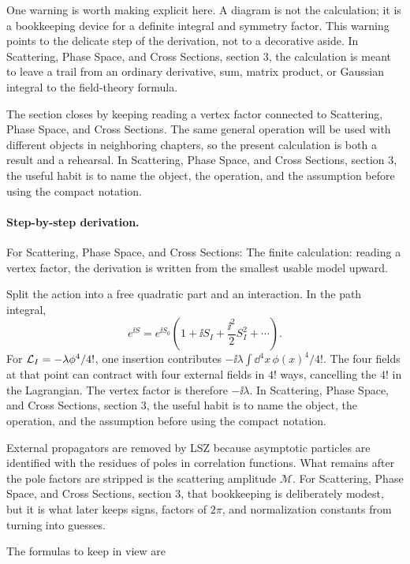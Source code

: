 One warning is worth making explicit here.  A diagram is not the calculation; it is a bookkeeping device for a definite integral and symmetry factor.  This warning points to the delicate step of the derivation, not to a decorative aside.  In Scattering, Phase Space, and Cross Sections, section 3, the calculation is meant to leave a trail from an ordinary derivative, sum, matrix product, or Gaussian integral to the field-theory formula.

The section closes by keeping reading a vertex factor connected to Scattering, Phase Space, and Cross Sections.  The same general operation will be used with different objects in neighboring chapters, so the present calculation is both a result and a rehearsal.  In Scattering, Phase Space, and Cross Sections, section 3, the useful habit is to name the object, the operation, and the assumption before using the compact notation.



\paragraph{Step-by-step derivation.}

For Scattering, Phase Space, and Cross Sections: The finite calculation: reading a vertex factor, the derivation is written from the smallest usable model upward.

Split the action into a free quadratic part and an interaction.  In the path integral,
\[
  e^{\ii S}=e^{\ii S_0}\left(1+\ii S_I+\frac{\ii^2}{2}S_I^2+\cdots\right).
\]
For \(\mathcal L_I=-\lambda\phi^4/4!\), one insertion contributes \(-\ii\lambda\int\dd^4x\,\phi(x)^4/4!\).  The four fields at that point can contract with four external fields in \(4!\) ways, cancelling the \(4!\) in the Lagrangian.  The vertex factor is therefore \(-\ii\lambda\).  In Scattering, Phase Space, and Cross Sections, section 3, the useful habit is to name the object, the operation, and the assumption before using the compact notation.

External propagators are removed by LSZ because asymptotic particles are identified with the residues of poles in correlation functions.  What remains after the pole factors are stripped is the scattering amplitude \(\mathcal M\).  For Scattering, Phase Space, and Cross Sections, section 3, that bookkeeping is deliberately modest, but it is what later keeps signs, factors of \(2\pi\), and normalization constants from turning into guesses.

The formulas to keep in view are

